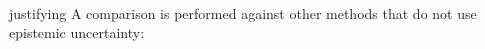 \documentclass[preview]{standalone}
\begin{document}
\begin{center}
\quad\\justifying
            A comparison is performed against other methods 
            that do not use epistemic uncertainty:
\end{center}
\end{document}
